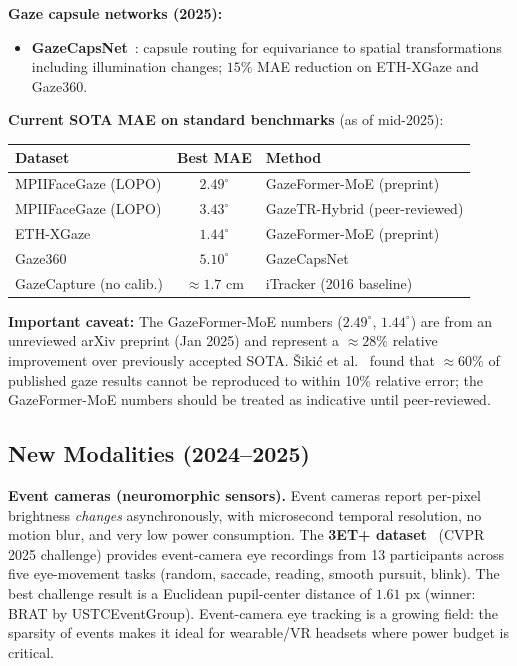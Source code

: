 \documentclass[11pt,a4paper]{article}
\begin{document}
\textbf{Gaze capsule networks (2025):}
\begin{itemize}
  \item \textbf{GazeCapsNet}~\cite{gazecapsnet2025}: capsule routing for
        equivariance to spatial transformations including illumination changes;
        $15\%$ MAE reduction on ETH-XGaze and Gaze360.
\end{itemize}

\textbf{Current SOTA MAE on standard benchmarks} (as of mid-2025):
\begin{center}
\begin{tabular}{lcl}
\hline
\textbf{Dataset} & \textbf{Best MAE} & \textbf{Method} \\
\hline
MPIIFaceGaze (LOPO) & $2.49^\circ$ & GazeFormer-MoE (preprint) \\
MPIIFaceGaze (LOPO) & $3.43^\circ$ & GazeTR-Hybrid (peer-reviewed) \\
ETH-XGaze & $1.44^\circ$ & GazeFormer-MoE (preprint) \\
Gaze360 & $5.10^\circ$ & GazeCapsNet \\
GazeCapture (no calib.) & $\approx1.7$ cm & iTracker (2016 baseline) \\
\hline
\end{tabular}
\end{center}

\noindent\textbf{Important caveat:} The GazeFormer-MoE numbers ($2.49^\circ$, $1.44^\circ$)
are from an unreviewed arXiv preprint (Jan 2025) and represent a $\approx28\%$ relative
improvement over previously accepted SOTA.
Šikić et al.~\cite{sikic2024reevaluation} found that $\approx60\%$ of published gaze results
cannot be reproduced to within 10\% relative error; the GazeFormer-MoE numbers should be
treated as indicative until peer-reviewed.

\subsection{New Modalities (2024--2025)}

\textbf{Event cameras (neuromorphic sensors).}
Event cameras report per-pixel brightness \emph{changes} asynchronously,
with microsecond temporal resolution, no motion blur, and very low power consumption.
The \textbf{3ET+ dataset}~\cite{threet2025} (CVPR 2025 challenge)
provides event-camera eye recordings from 13 participants across five eye-movement tasks
(random, saccade, reading, smooth pursuit, blink).
The best challenge result is a Euclidean pupil-center distance of $1.61$ px
(winner: BRAT by USTCEventGroup).
Event-camera eye tracking is a growing field: the sparsity of events makes it ideal for
wearable/VR headsets where power budget is critical.
\end{document}
